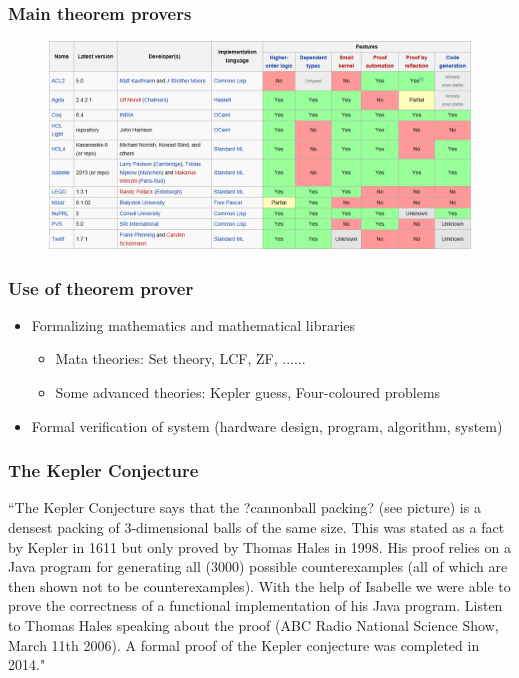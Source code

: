 \documentclass{beamer}
\begin{document}
\begin{frame}\frametitle{Main theorem provers}

\begin{figure}[!ht]

\includegraphics[width=1.0\textwidth]{thp.png}

\label{fig:arch}
\end{figure}
\end{frame}

\begin{frame}\frametitle{Use of theorem prover}

\begin{itemize}
\item Formalizing mathematics and mathematical libraries
\begin{itemize}
\item Mata theories: Set theory, LCF, ZF, ......
\item Some advanced theories: Kepler guess, Four-coloured problems

\end{itemize}
\item Formal verification of system (hardware design, program, algorithm, system)
\end{itemize}

\end{frame}

\begin{frame}\frametitle{The Kepler Conjecture}
\noindent
``The Kepler Conjecture says that the ?cannonball packing? (see picture) is a densest packing of 3-dimensional balls of the same size. This was stated as a fact by Kepler in 1611 but only proved by Thomas Hales in 1998. His proof relies on a Java program for generating all (3000) possible counterexamples (all of which are then shown not to be counterexamples). With the help of Isabelle we were able to prove the correctness of a functional implementation of his Java program. Listen to Thomas Hales speaking about the proof (ABC Radio National Science Show, March 11th 2006). A formal proof of the Kepler conjecture was completed in 2014."
\end{frame}
\end{document}
